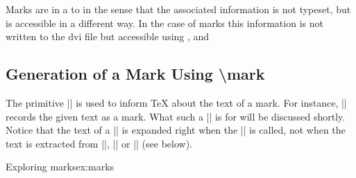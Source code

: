 Marks are in a  to  in the sense that the 
associated information is not typeset, but is accessible in a different way. In the 
case of marks this information is not written to the dvi file but accessible using 
,  and 



\subsection{Generation of a Mark Using \textbackslash mark}
 
The primitive |\mark| is used to inform TeX about the text of a mark. For instance, 
|\mark| records the given text as a mark. What such a |\mark| is for 
will be discussed shortly. Notice that the text of a |\mark| is expanded right when 
the |\mark| is called, not when the text is extracted from |\topmark|, |\firstmark| 
or |\botmark| (see below). 

\begin{texexample}{Exploring marks}{ex:marks}
\meaning\mark

\meaning\topmark

\meaning\firstmark

\meaning\botmark
\end{texexample}



